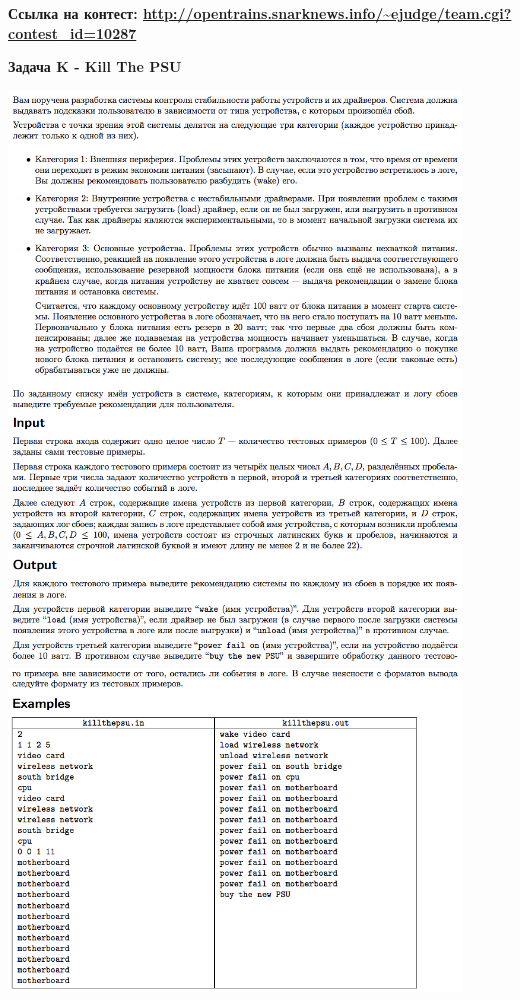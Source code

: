 \documentclass[a4paper,12pt]{article}
\begin{document}
\textbf{{\large Ссылка на контест: \url{http://opentrains.snarknews.info/~ejudge/team.cgi?contest_id=10287}}}

\newpage
\textbf{{\large Задача K - Kill The PSU}}

\begin{center}
\includegraphics[width=0.9\textwidth]{OC_Northern/OC_Northern_K1.png}\\ [1cm]
\includegraphics[width=0.9\textwidth]{OC_Northern/OC_Northern_K2.png}\\ [1cm]
\end{center}
\end{document}
